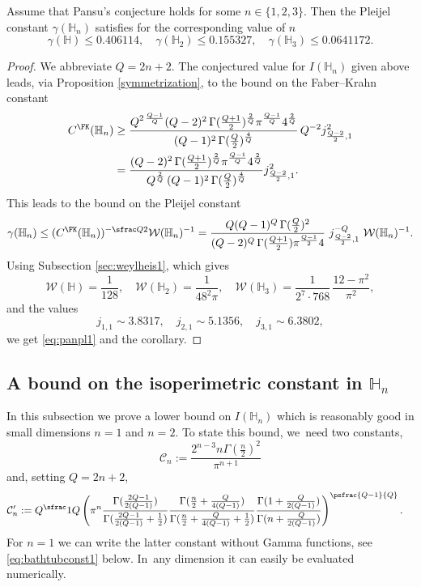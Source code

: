 \begin{corollary}\label{pansupleijelk0}
Assume that Pansu's conjecture holds for some $n\in\{1,2,3\}$. Then the Pleijel constant $\gamma(\mathbb H_n)$ satisfies for the corresponding value of $n$
\begin{equation}\label{eq:panpl1}
\gamma(\mathbb H) \leq 0.406114,
\quad
\gamma(\mathbb H_2) \leq 0.155327,
\quad
\gamma(\mathbb H_3) \leq 0.0641172.
\end{equation}
\end{corollary}

\begin{proof}
We abbreviate $Q=2n+2$. The conjectured value for $I(\mathbb H_n)$ given above leads, via Proposition \ref{symmetrization}, to the bound on the Faber--Krahn constant
\begin{align*}
C^\FK(\mathbb H_n)
& \geq \frac{Q^{2\,\frac{Q-1}{Q}}(Q-2)^2 \,\Gamma(\tfrac{Q+1}{2})^{\frac 2Q} \pi^\frac{Q-1}{Q} 4^{\frac 2Q}}{(Q-1)^2\,\Gamma(\frac Q2)^\frac 4Q}\,
Q^{-2} j_{\frac{Q-2}{2},1}^2 \\
& =
\frac{(Q-2)^2 \,\Gamma(\tfrac{Q+1}{2})^{\frac 2Q} \pi^\frac{Q-1}{Q} 4^{\frac 2Q}}{Q^{\frac 2Q}\,(Q-1)^2\,\Gamma(\frac Q2)^\frac 4Q} j_{\frac{Q-2}{2},1}^2.
\end{align*}
This leads to the bound on the Pleijel constant
\[
\gamma(\mathbb H_n) \leq (C^\FK(\mathbb H_n))^{-\sfrac Q2} \mathcal W(\mathbb H_n)^{-1}
= \frac{Q (Q-1)^Q\,\Gamma(\frac Q2)^2} {(Q-2)^Q \,\Gamma(\tfrac{Q+1}{2}) \pi^{\frac{Q-1}2} 4} \ j_{\frac{Q-2}{2},1}^{-Q} \ \mathcal W(\mathbb H_n)^{-1}.
\]
Using Subsection \ref{sec:weylheis1}, which gives
\[
\mathcal W(\mathbb H) = \frac1{128},\quad
\mathcal W(\mathbb H_2) = \frac{1}{48^2\pi},\quad
\mathcal W(\mathbb H_3) = \frac{1}{2^7 \cdot 768}\,\frac{12 - \pi^2}{\pi^2},
\]
and the values \cite[Table 9.5]{AbSt}
\[
j_{1,1}\sim 3.8317,\quad
j_{2,1}\sim 5.1356,\quad
j_{3,1}\sim 6.3802,
\]
we get \eqref{eq:panpl1} and the corollary.
\end{proof}

\subsection{A bound on the isoperimetric constant in $\mathbb H_n$}
In this subsection we prove a lower bound on $I(\mathbb H_n)$ which is reasonably good in small dimensions $n=1$ and $n=2$. To state this bound, we~need two constants,
\begin{equation}\label{eq:sobrepconst}
\mathcal C_n := \frac{2^{n-3} n\Gamma(\frac n2)^2}{\pi^{n+1}}
\end{equation}
and, setting $Q=2n+2$,
\begin{align}\label{eq:bathtubconst}
\mathcal C_n' & := Q^\sfrac1Q \left(\pi^n \frac{\Gamma(\frac{2Q-1}{2(Q-1)})}{\Gamma(\frac{2Q-1}{2(Q-1)}+\frac12)} \frac{\Gamma(\frac n2+\frac{Q}{4(Q-1)})}{\Gamma(\frac n2+\frac{Q}{4(Q-1)}+\frac12)}
\frac{\Gamma(1+\frac{Q}{2(Q-1)})}{\Gamma(n+\frac{Q}{2(Q-1)})}\right)^\psfrac{Q-1}{Q}.
\end{align}
For $n=1$ we can write the latter constant without Gamma functions, see \eqref{eq:bathtubconst1} below. In~any dimension it can easily be evaluated numerically.

